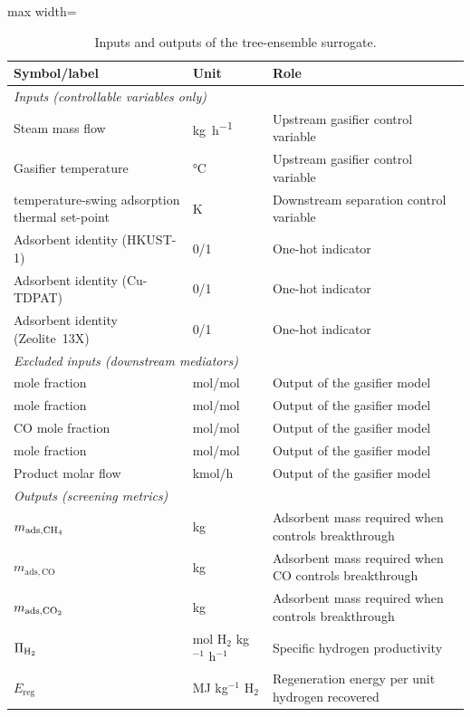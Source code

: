 \documentclass[11pt,a4paper]{article}
\newcommand{\Htwo}{\ce{H2}}
\newcommand{\COtwo}{\ce{CO2}}
\newcommand{\CHfour}{\ce{CH4}}
\newcommand{\TSA}{temperature-swing adsorption}
\begin{document}
\begin{table}[htbp]
\centering
\caption{Inputs and outputs of the tree-ensemble surrogate.}
\label{tabS:xgbio}
\small
\begin{adjustbox}{max width=\textwidth}
\begin{tabular}{lll}
\toprule
Symbol/label & Unit & Role \\
\midrule
\multicolumn{3}{l}{\textit{Inputs (controllable variables only)}} \\
Steam mass flow & \si{kg.h^{-1}} & Upstream gasifier control variable \\
Gasifier temperature & \si{\celsius} & Upstream gasifier control variable \\
\TSA{} thermal set-point & K & Downstream separation control variable \\
Adsorbent identity (HKUST-1) & 0/1 & One-hot indicator \\
Adsorbent identity (Cu-TDPAT) & 0/1 & One-hot indicator \\
Adsorbent identity (Zeolite~13X) & 0/1 & One-hot indicator \\
\midrule
\multicolumn{3}{l}{\textit{Excluded inputs (downstream mediators)}} \\
\Htwo{} mole fraction & mol/mol & Output of the gasifier model \\
\COtwo{} mole fraction & mol/mol & Output of the gasifier model \\
CO mole fraction & mol/mol & Output of the gasifier model \\
\CHfour{} mole fraction & mol/mol & Output of the gasifier model \\
Product molar flow & kmol/h & Output of the gasifier model \\
\midrule
\multicolumn{3}{l}{\textit{Outputs (screening metrics)}} \\
$m_{\mathrm{ads},\CHfour}$ & kg & Adsorbent mass required when \CHfour{} controls breakthrough \\
$m_{\mathrm{ads},\mathrm{CO}}$ & kg & Adsorbent mass required when CO controls breakthrough \\
$m_{\mathrm{ads},\COtwo}$ & kg & Adsorbent mass required when \COtwo{} controls breakthrough \\
$\Pi_{\Htwo}$ & mol H$_2$ kg$^{-1}$ h$^{-1}$ & Specific hydrogen productivity \\
$E_{\mathrm{reg}}$ & MJ kg$^{-1}$ H$_2$ & Regeneration energy per unit hydrogen recovered \\
\bottomrule
\end{tabular}
\end{adjustbox}
\end{table}
\end{document}
